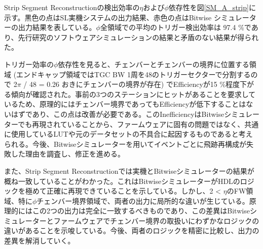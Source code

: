 Strip Segment Reconstructionの検出効率の$\eta$および$\phi$依存性を図\ref{SM_A_strip}に示す。黒色の点はSL実機システムの出力結果、赤色の点はBitwise シミュレーターの出力結果を表している。$\phi$全領域での平均のトリガー検出効率は 97.4 \%であり、先行研究のソフトウェアシミュレーションの結果と矛盾のない結果が得られた。

トリガー効率の$\phi$依存性を見ると、チェンバーとチェンバーの境界に位置する領域 (エンドキャップ領域ではTGC BW 1周を48のトリガーセクターで分割するので 2$\pi$ / 48 = 0.26 おきにチェンバーの境界が存在) でEfficiencyが15 \%程度下がる傾向が確認された。事前の3つのステーションにヒットがあることを要求しているため、原理的にはチェンバー境界であってもEfficiencyが低下することはないはずであり、この点は改善が必要である。このInefficiencyはBitwiseシミュレーターでも再現されていることから、ファームウェアに固有の問題ではなく、共通に使用しているLUTや元のデータセットの不具合に起因するものであると考えられる。今後、Bitwiseシミュレーターを用いてイベントごとに飛跡再構成が失敗した理由を調査し、修正を進める。

また、Strip Segment Reconstructionでは実機とBitwiseシミュレーターの結果が概ね一致していることがわかった。これはBitwiseシミュレーターがHDLのロジックを極めて正確に再現できていることを示している。しかし、2 < $\eta$のFW領域、特に$\phi$チェンバー境界領域で、両者の出力に局所的な違いが生じている。原理的にはこの2つの出力は完全に一致するべきものであり、この差異はBitwiseシミュレーターとファームウェアでチェンバー境界の取扱いにわずかなロジックの違いがあることを示唆している。今後、両者のロジックを精密に比較し、出力の差異を解消していく。

